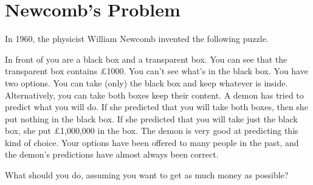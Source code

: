


\section{Newcomb's Problem}

In 1960, the physicist William Newcomb invented the following puzzle.

\begin{example}
  In front of you are a black box and a transparent box. You can see that the
  transparent box contains £1000. You can't see what's in the black box. You
  have two options. You can take (only) the black box and keep whatever is
  inside. Alternatively, you can take both boxes keep their content. A demon
  has tried to predict what you will do. If she predicted that you will take
  both boxes, then she put nothing in the black box. If she predicted that you
  will take just the black box, she put £1,000,000 in the box. The demon is very
  good at predicting this kind of choice. Your options have been offered to many
  people in the past, and the demon's predictions have almost always been
  correct.
\end{example}
%
What should you do, assuming you want to get as much money as
possible?

